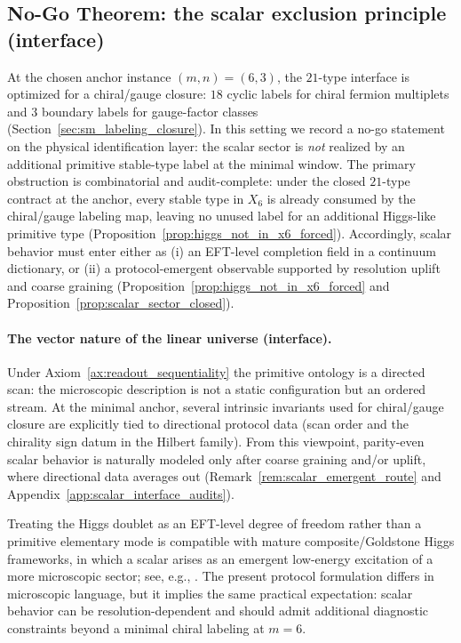 \subsection{No-Go Theorem: the scalar exclusion principle (interface)}
\label{subsec:scalar_sectors_interface}

At the chosen anchor instance $(m,n)=(6,3)$, the $21$-type interface is optimized for a chiral/gauge closure:
$18$ cyclic labels for chiral fermion multiplets and $3$ boundary labels for gauge-factor classes (Section~\ref{sec:sm_labeling_closure}).
In this setting we record a no-go statement on the physical identification layer:
the scalar sector is \emph{not} realized by an additional primitive stable-type label at the minimal window.
\InterfaceTag The primary obstruction is combinatorial and audit-complete: under the closed $21$-type contract at the anchor, every stable type in $X_6$ is already consumed by the chiral/gauge labeling map, leaving no unused label for an additional Higgs-like primitive type (Proposition~\ref{prop:higgs_not_in_x6_forced}).
Accordingly, scalar behavior must enter either as (i) an EFT-level completion field in a continuum dictionary, or (ii) a protocol-emergent observable supported by resolution uplift and coarse graining (Proposition~\ref{prop:higgs_not_in_x6_forced} and Proposition~\ref{prop:scalar_sector_closed}).

\paragraph{The vector nature of the linear universe (interface).}
\AuditTag Under Axiom~\ref{ax:readout_sequentiality} the primitive ontology is a directed scan: the microscopic description is not a static configuration but an ordered stream.
At the minimal anchor, several intrinsic invariants used for chiral/gauge closure are explicitly tied to directional protocol data (scan order and the chirality sign datum in the Hilbert family).
From this viewpoint, parity-even scalar behavior is naturally modeled only after coarse graining and/or uplift, where directional data averages out (Remark~\ref{rem:scalar_emergent_route} and Appendix~\ref{app:scalar_interface_audits}).

\begin{remark}\label{rem:composite_higgs_relation}
Treating the Higgs doublet as an EFT-level degree of freedom rather than a primitive elementary mode is compatible with mature composite/Goldstone Higgs frameworks, in which a scalar arises as an emergent low-energy excitation of a more microscopic sector; see, e.g., \cite{Contino2011TASICompositeHiggs,PanicoWulzer2016CompositeHiggs}.
The present protocol formulation differs in microscopic language, but it implies the same practical expectation: scalar behavior can be resolution-dependent and should admit additional diagnostic constraints beyond a minimal chiral labeling at $m=6$.
\end{remark}


